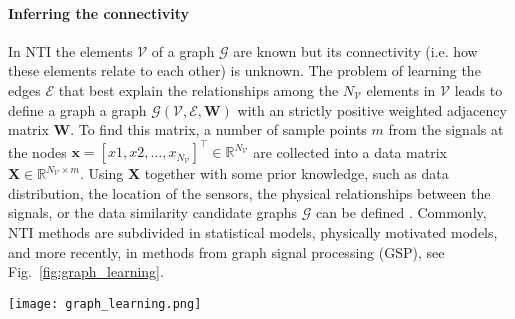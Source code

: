 \paragraph*{Inferring the connectivity}
In NTI the elements $\mathcal{V}$ of a graph $\mathcal{G}$ are known but its connectivity (i.e. how these elements relate to each other) is unknown. %
The problem of learning the edges $\mathcal{E}$ that best explain the relationships among the $N_\mathcal{V}$ elements in $\mathcal{V}$ leads to define a graph a graph $\mathcal{G}\left(\mathcal{V},\mathcal{E},\bm{W}\right)$ with an strictly positive weighted adjacency matrix $\bm{W}$. To find this matrix, a number of sample points $m$ from the signals at the nodes $\bm{x} = [x1,x2,\ldots, x_{N_\mathcal{V}}]^\intercal \in \mathbb{R}^{N_\mathcal{V}}$ are collected into a data matrix $\bm{X} \in \mathbb{R}^{N_\mathcal{V} \times m}$. Using $\bm{X}$ together with some prior knowledge, such as  data distribution, the location of the sensors, the physical relationships between the signals, or the data similarity candidate graphs $\mathcal{G}$ can be defined \cite{Dong2019Learninggraphsdata,Stankovic2019Introductiongraphsignal}. Commonly, NTI methods are subdivided in statistical models, physically motivated models, and more recently, in methods from graph signal processing (GSP), see Fig.~\ref{fig:graph_learning}. 
\begin{figure*}[!t]
	\centering	
	\hspace*{\fill}
	\texttt{[image: graph\_learning.png]}
	\hspace*{\fill}	
	\caption[] {\label{fig:graph_learning}\textbf{Different methods for NTI.} Image taken from \cite{Dong2019Learninggraphsdata}.}
\end{figure*}

